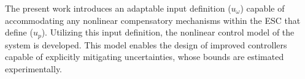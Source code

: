 The present work introduces an adaptable input definition ($u_\omega$) capable of accommodating any nonlinear compensatory mechanisms within the ESC that define ($u_p$). Utilizing this input definition, the nonlinear control model of the system is developed. This model enables the design of improved controllers capable of explicitly mitigating uncertainties, whose bounds are estimated experimentally.
